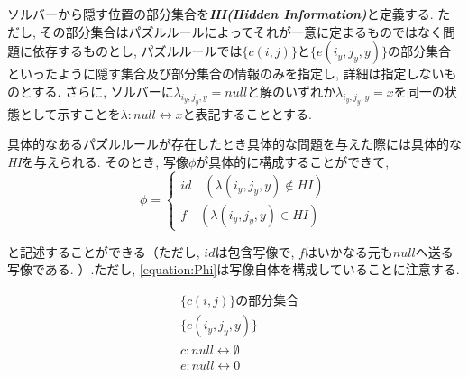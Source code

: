 \begin{definition}\label{definition:HiddenInformation}
  ソルバーから隠す位置の部分集合を\textbf{\textit{HI(Hidden Information)}}と定義する.
  ただし, その部分集合はパズルルールによってそれが一意に定まるものではなく問題に依存するものとし, パズルルールでは$\{c(i,j)\}$と$\{e(i_y,j_y,y)\}$の部分集合といったように隠す集合及び部分集合の情報のみを指定し, 詳細は指定しないものとする.
  さらに, ソルバーに$\lambda_{i_y,j_y,y}=\textit{null}$と解のいずれか$\lambda_{i_y,j_y,y}=x$を同一の状態として示すことを$\lambda\colon\textit{null}\leftrightarrow x$と表記することとする.

\end{definition}
具体的なあるパズルルールが存在したとき具体的な問題を与えた際には具体的な\textit{HI}を与えられる. そのとき, 写像$\phi$が具体的に構成することができて,
\begin{equation}\label{equation:Phi}
  \phi=
  \begin{cases}
    {id \quad (\lambda(i_y,j_y,y) \not\in HI)} \\
    {f \quad (\lambda(i_y,j_y,y) \in HI)}
  \end{cases}
\end{equation}

と記述することができる（ただし, $id$は包含写像で, $f$はいかなる元も$null$へ送る写像である. ）.ただし, \cref{equation:Phi}は写像自体を構成していることに注意する.

\begin{example}\label{example:SlitherLinkHiddenInformation}
  \begin{align}
     & \{c(i,j)\}の部分集合                              \\
     & \{e(i_y,j_y,y)\}                             \\
     & c\colon\textit{null}\leftrightarrow\emptyset \\
     & e\colon\textit{null}\leftrightarrow 0
  \end{align}
\end{example}


